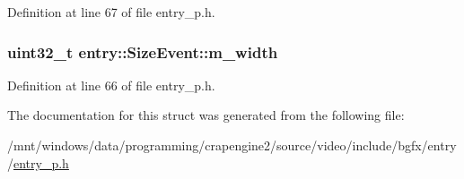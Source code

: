 Definition at line 67 of file entry\+\_\+p.\+h.

\hypertarget{structentry_1_1_size_event_a57acae9e73a5e52d05c4b8f4099e8ecb}{
\subsubsection[{m\+\_\+width}]{\setlength{\rightskip}{0pt plus 5cm}uint32\+\_\+t entry\+::\+Size\+Event\+::m\+\_\+width}}\label{structentry_1_1_size_event_a57acae9e73a5e52d05c4b8f4099e8ecb}


Definition at line 66 of file entry\+\_\+p.\+h.



The documentation for this struct was generated from the following file\+:\begin{DoxyCompactItemize}
\item 
/mnt/windows/data/programming/crapengine2/source/video/include/bgfx/entry/\hyperlink{entry__p_8h}{entry\+\_\+p.\+h}\end{DoxyCompactItemize}

